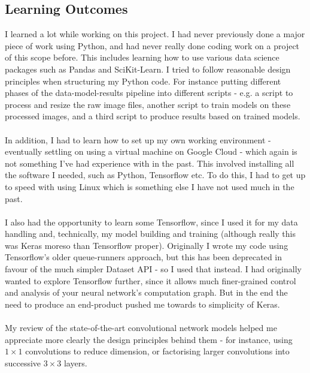 \documentclass[11pt]{article} %
\theoremstyle{plain}
\theoremstyle{definition}
\begin{document}
\subsection{Learning Outcomes}
I learned a lot while working on this project. I had never previously done a major piece of work using Python, and had never really done coding work on a project of this scope before. This includes learning how to use various data science packages such as Pandas and SciKit-Learn. I tried to follow reasonable design principles when structuring my Python code. For instance putting different phases of the data-model-results pipeline into different scripts - e.g. a script to process and resize the raw image files, another script to train models on these processed images, and a third script to produce results based on trained models.
\\
\\
\noindent
In addition, I had to learn how to set up my own working environment - eventually settling on using a virtual machine on Google Cloud - which again is not something I've had experience with in the past. This involved installing all the software I needed, such as Python, Tensorflow etc. To do this, I had to get up to speed with using Linux which is something else I have not used much in the past.
\\
\\
\noindent
I also had the opportunity to learn some Tensorflow, since I used it for my data handling and, technically, my model building and training (although really this was Keras moreso than Tensorflow proper). Originally I wrote my code using Tensorflow's older queue-runners approach, but this has been deprecated in favour of the much simpler Dataset API - so I used that instead. I had originally wanted to explore Tensorflow further, since it allows much finer-grained control and analysis of your neural network's computation graph. But in the end the need to produce an end-product pushed me towards to simplicity of Keras.
\\
\\
\noindent
My review of the state-of-the-art convolutional network models helped me appreciate more clearly the design principles behind them - for instance, using \(1 \times 1\) convolutions to reduce dimension, or factorising larger convolutions into successive \(3 \times 3\) layers.



\clearpage


\end{document}
